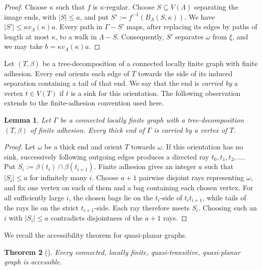 \documentclass[10pt,a4paper]{amsart}
\newtheorem{theorem}{Theorem}[section]%
\newtheorem{lemma}[theorem]{Lemma}
\theoremstyle{definition}
\begin{document}
\begin{proof}
Choose $\kappa$ such that $f$ is $\kappa$-regular.
Choose $S\subseteq V(\Lambda)$ separating the image ends, with $|S|\leq a$, and put $S':=f^{-1}(B_\Lambda(S,\kappa))$.
We have $|S'|\leq \kappa v_\Lambda(\kappa)a$.
Every path in $\Gamma-S'$ maps, after replacing its edges by paths of length at most $\kappa$, to a walk in $\Lambda-S$.
Consequently, $S'$ separates $\omega$ from $\xi$, and we may take $b=\kappa v_\Lambda(\kappa)a$.
\end{proof}

Let $(T,\beta)$ be a tree-decomposition of a connected locally finite graph with finite adhesion.
Every end orients each edge of $T$ towards the side of its induced separation containing a tail of that end.
We say that the end is \emph{carried by} a vertex $t\in V(T)$ if $t$ is a sink for this orientation.
The following observation extends \cite[Prop.~4.8(ii)]{hamann2022stallings} to the finite-adhesion convention used here.

\begin{lemma}\label{lem:thick-end-carried}
Let $\Gamma$ be a connected locally finite graph with a tree-decomposition $(T,\beta)$ of finite adhesion.
Every thick end of $\Gamma$ is carried by a vertex of $T$.
\end{lemma}

\begin{proof}
Let $\omega$ be a thick end and orient $T$ towards $\omega$.
If this orientation has no sink, successively following outgoing edges produces a directed ray $t_0,t_1,t_2,\ldots$.
Put $S_i:=\beta(t_i)\cap\beta(t_{i+1})$.
Finite adhesion gives an integer $a$ such that $|S_i|\leq a$ for infinitely many $i$.
Choose $a+1$ pairwise disjoint rays representing $\omega$, and fix one vertex on each of them and a bag containing each chosen vertex.
For all sufficiently large $i$, the chosen bags lie on the $t_i$-side of $t_it_{i+1}$, while tails of the rays lie on the strict $t_{i+1}$-side.
Each ray therefore meets $S_i$.
Choosing such an $i$ with $|S_i|\leq a$ contradicts disjointness of the $a+1$ rays.
\end{proof}

We recall the accessibility theorem for quasi-planar graphs.

\begin{theorem}[{\cite[Thm.~A]{macmanus2023accessibility}}]\label{thm:quasi-planar-accessible}
Every connected, locally finite, quasi-transitive, quasi-planar graph is accessible.
\end{theorem}
\end{document}
